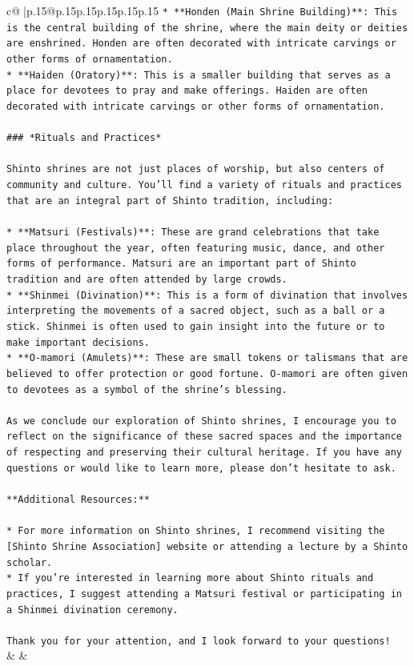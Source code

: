 \documentclass{article}
\begin{document}
{\begin{supertabular}{c@{$\;$}|p{.15\linewidth}@{}p{.15\linewidth}p{.15\linewidth}p{.15\linewidth}p{.15\linewidth}p{.15\linewidth}}
{{{\texttt{* **Honden (Main Shrine Building)**: This is the central building of the shrine, where the main deity or deities are enshrined. Honden are often decorated with intricate carvings or other forms of ornamentation.} \\
\texttt{* **Haiden (Oratory)**: This is a smaller building that serves as a place for devotees to pray and make offerings. Haiden are often decorated with intricate carvings or other forms of ornamentation.} \\
\\ 
\texttt{\#\#\# *Rituals and Practices*} \\
\\ 
\texttt{Shinto shrines are not just places of worship, but also centers of community and culture. You'll find a variety of rituals and practices that are an integral part of Shinto tradition, including:} \\
\\ 
\texttt{* **Matsuri (Festivals)**: These are grand celebrations that take place throughout the year, often featuring music, dance, and other forms of performance. Matsuri are an important part of Shinto tradition and are often attended by large crowds.} \\
\texttt{* **Shinmei (Divination)**: This is a form of divination that involves interpreting the movements of a sacred object, such as a ball or a stick. Shinmei is often used to gain insight into the future or to make important decisions.} \\
\texttt{* **O{-}mamori (Amulets)**: These are small tokens or talismans that are believed to offer protection or good fortune. O{-}mamori are often given to devotees as a symbol of the shrine's blessing.} \\
\\ 
\texttt{As we conclude our exploration of Shinto shrines, I encourage you to reflect on the significance of these sacred spaces and the importance of respecting and preserving their cultural heritage. If you have any questions or would like to learn more, please don't hesitate to ask.} \\
\\ 
\texttt{**Additional Resources:**} \\
\\ 
\texttt{* For more information on Shinto shrines, I recommend visiting the {[}Shinto Shrine Association{]} website or attending a lecture by a Shinto scholar.} \\
\texttt{* If you're interested in learning more about Shinto rituals and practices, I suggest attending a Matsuri festival or participating in a Shinmei divination ceremony.} \\
\\ 
\texttt{Thank you for your attention, and I look forward to your questions!} \\
            }
        }
    }
    & & \\ \\


\end{supertabular}}
\end{document}
